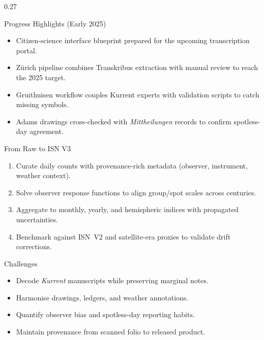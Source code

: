 \documentclass[final]{beamer}
\newenvironment{tightblock}[1]{%
  \begin{block}{#1}\vspace{0.6em}
}{\vspace{0.6em}\end{block}}
\begin{document}
\begin{frame}[t]
\begin{columns}[t,totalwidth=0.98\paperwidth]
\begin{column}{0.27\paperwidth}
\begin{tightblock}{Progress Highlights (Early 2025)}
\begin{itemize}
  \item Citizen-science interface blueprint prepared for the upcoming transcription portal.
  \item Zürich pipeline combines Transkribus extraction with manual review to reach the 2025 target.
  \item Gruithuisen workflow couples Kurrent experts with validation scripts to catch missing symbols.
  \item Adams drawings cross-checked with \emph{Mittheilungen} records to confirm spotless-day agreement.
\end{itemize}
\end{tightblock}
\begin{tightblock}{From Raw to ISN V3}
\begin{enumerate}
  \item Curate daily counts with provenance-rich metadata (observer, instrument, weather context).
  \item Solve observer response functions to align group/spot scales across centuries.
  \item Aggregate to monthly, yearly, and hemispheric indices with propagated uncertainties.
  \item Benchmark against ISN~V2 and satellite-era proxies to validate drift corrections.
\end{enumerate}
\end{tightblock}

\begin{tightblock}{Challenges}
\begin{itemize}
  \item Decode \emph{Kurrent} manuscripts while preserving marginal notes.
  \item Harmonise drawings, ledgers, and weather annotations.
  \item Quantify observer bias and spotless-day reporting habits.
  \item Maintain provenance from scanned folio to released product.
\end{itemize}
\end{tightblock}


\end{column}
\end{columns}
\end{frame}
\end{document}

